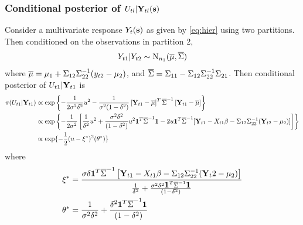 \subsubsection*{Conditional posterior of $U_{tl} | \mbox{\bf Y}_{tl}(\mbox{\bf s})$}\label{s:mvcondu}
Consider a multivariate response $Y_t(\mbox{\bf s})$ as given by \ref{eq:hier} using two partitions. 
Then conditioned on the observations in partition 2,  
\begin{align}
  Y_{t1} | Y_{t2} \sim \mbox{N}_{n_1} (\overline{\mu}, \overline{\Sigma})
\end{align}
where $\overline{\mu} = \mu_1 + \Sigma_{12} \Sigma_{22}^{-1}(y_{t2} - \mu_{2})$, and $\overline{\Sigma} = \Sigma_{11} - \Sigma_{12} \Sigma_{22}^{-1}\Sigma_{21}$. 
Then conditional posterior of $U_{t1} | \mbox{\bf Y}_{t1}$ is
\begin{align}
  \pi(U_{t1} | \mbox{\bf Y}_{t1}) & \propto \exp \left\{ -\frac{ 1 }{ 2 \sigma^2 \delta^2 } u^2 - \frac{ 1 }{ \sigma^2 (1 - \delta^2 ) } \left[ \mbox{\bf Y}_{t1} - \overline{\mu} \right]^T \overline{\Sigma}^{-1} \left[ \mbox{\bf Y}_{t1} - \overline{\mu} \right] \right\}\\
  & \propto \exp \left\{ - \frac{1}{2 \sigma^2} \left[ \frac{ 1 }{ \delta^2 } u^2 + \frac{ \sigma^2 \delta^2 }{ (1 - \delta^2) } u^2 \mbox{\boldmath $1$}^T \overline{\Sigma}^{-1} \mbox{\boldmath $1$} - 2u\mbox{\boldmath $1$}^T \overline{\Sigma}^{-1} [\mbox{\bf Y}_{t1} - X_{t1}\beta - \Sigma_{12} \Sigma_{22}^{-1} (\mbox{\bf Y}_{t2} - \mu_2)] \right]\right\}\\
  & \propto \exp \{ -\frac{ 1 }{ 2 } (u - \xi^*)^2 (\theta^*) \}
\end{align}
where
\begin{align}
  \xi^* &= \frac{ \sigma \delta \mbox{\boldmath $1$}^T \overline{\Sigma}^{-1}\left[ \mbox{\bf Y}_{t1} - X_{t1}\beta - \Sigma_{12} \Sigma_{22}^{-1} (\mbox{\bf Y}_t2 - \mu_2)\right]}{\frac{ 1 }{ \delta^2 } + \frac{ \sigma^2 \delta^2 \mbox{\boldmath $1$}^T \overline{\Sigma}^{-1} \mbox{\boldmath $1$}}{(1 - \delta^2)}}\\
  \theta^* &= \frac{ 1 }{ \sigma^2 \delta^2 } + \frac{ \delta^2 \mbox{\boldmath $1$}^T \overline{\Sigma}^{-1} \mbox{\boldmath $1$} }{ (1 - \delta^2 )}
\end{align}


